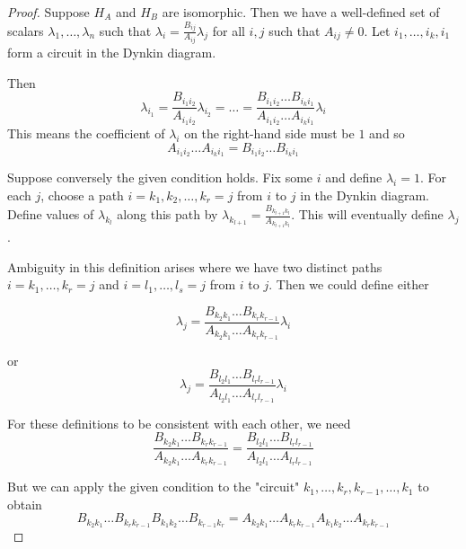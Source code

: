 \documentclass[11pt,a4paper]{report}
\theoremstyle{definition}
\begin{document}
\begin{proof} Suppose $H_A$ and $H_B$ are isomorphic. Then we have a well-defined set of scalars $\lambda_1, \ldots, \lambda_n$ such that $\lambda_i = \frac{B_{ij}}{A_{ij}} \lambda_j$ for all $i, j$ such that $A_{ij} \neq 0$. Let $i_1, \ldots, i_k, i_1$ form a circuit in the Dynkin diagram.  

Then \begin{equation*}\lambda_{i_1} = \dfrac{B_{i_1i_2}}{A_{i_1i_2}} \lambda_{i_2} = \ldots = \dfrac{B_{i_1i_2} \ldots B_{i_k i_1}}{A_{i_1i_2} \ldots A_{i_k i_1}} \lambda_i\end{equation*} This means the coefficient of $\lambda_i$ on the right-hand side must be $1$ and so \begin{equation*}A_{i_1 i_2} \ldots A_{i_k i_1} = B_{i_1 i_2} \ldots B_{i_k i_1}\end{equation*}

Suppose conversely the given condition holds. Fix some $i$ and define $\lambda_i = 1$. For each $j$, choose a path $i = k_1, k_2, \ldots, k_r = j$ from $i$ to $j$ in the Dynkin diagram. Define values of $\lambda_{k_l}$ along this path by $\lambda_{k_{l+1}} = \frac{B_{k_{l+1} k_l}}{A_{k_{l+1} k_l}}$. This will eventually define $\lambda_j$.

Ambiguity in this definition arises where we have two distinct paths $i = k_1, \ldots, k_r = j$ and $i = l_1, \ldots, l_s = j$ from $i$ to $j$. Then we could define either 

\begin{equation*}\lambda_j = \dfrac{B_{k_2 k_1} \ldots B_{k_r k_{r-1}}}{A_{k_2k_1} \ldots A_{k_r k_{r-1}}} \lambda_i\end{equation*}

or
\begin{equation*}\lambda_j = \dfrac{B_{l_2 l_1} \ldots B_{l_r l_{r-1}}}{A_{l_2l_1} \ldots A_{l_r l_{r-1}}} \lambda_i\end{equation*}

For these definitions to be consistent with each other, we need \begin{equation*}\dfrac{B_{k_2 k_1} \ldots B_{k_r k_{r-1}}}{A_{k_2k_1} \ldots A_{k_r k_{r-1}}} = \dfrac{B_{l_2 l_1} \ldots B_{l_r l_{r-1}}}{A_{l_2l_1} \ldots A_{l_r l_{r-1}}} \end{equation*}

But we can apply the given condition to the "circuit" $k_1, \ldots, k_r, k_{r-1}, \ldots, k_1$ to obtain \begin{equation*}B_{k_2 k_1} \ldots B_{k_r k_{r-1}} B_{k_1 k_2} \ldots B_{k_{r-1} k_r} = A_{k_2 k_1} \ldots A_{k_r k_{r-1}} A_{k_1 k_2} \ldots A_{k_r k_{r-1}}\end{equation*} 


\end{proof}
\end{document}
